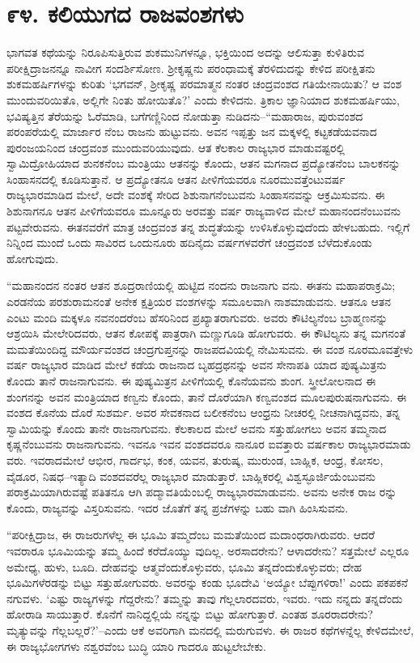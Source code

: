 
\chapter{೯೪. ಕಲಿಯುಗದ ರಾಜವಂಶಗಳು}

ಭಾಗವತ ಕಥೆಯನ್ನು ನಿರೂಪಿಸುತ್ತಿರುವ ಶುಕಮುನಿಗಳನ್ನೂ, ಭಕ್ತಿಯಿಂದ ಅದನ್ನು ಆಲಿಸುತ್ತಾ ಕುಳಿತಿರುವ ಪರೀಕ್ಷಿದ್ರಾಜನನ್ನೂ ನಾವೀಗ ಸಂದರ್ಶಿಸೋಣ. ಶ್ರೀಕೃಷ್ಣನು ಪರಂಧಾಮಕ್ಕೆ ತೆರಳಿದುದನ್ನು ಕೇಳಿದ ಪರೀಕ್ಷಿತನು ಶುಕಮಹರ್ಷಿಗಳನ್ನು ಕುರಿತು ‘ಭಗವನ್, ಶ್ರೀಕೃಷ್ಣ ಪರಮಾತ್ಮನ ನಂತರ ಚಂದ್ರವಂಶದ ಗತಿಯೇನಾಯಿತು? ಆ ವಂಶ ಮುಂದುವರಿಯಿತೊ, ಅಲ್ಲಿಗೇ ನಿಂತು ಹೋಯಿತೊ?’ ಎಂದು ಕೇಳಿದನು. ತ್ರಿಕಾಲ ಜ್ಞಾನಿಯಾದ ಶುಕಮಹರ್ಷಿಯು, ಭವಿಷ್ಯತ್ತಿನ ತೆರೆಯನ್ನು ಓರೆಮಾಡಿ, ಬಗೆಗಣ್ಣಿನಿಂದ ನೋಡುತ್ತಾ ನುಡಿದನು–“ಮಹಾರಾಜ, ಪುರುವಂಶದ ಪರಂಪರೆಯಲ್ಲಿ ಮಾರ್ಜಾರ ನೆಂಬ ರಾಜನು ಹುಟ್ಟುವನು. ಅವನ ಇಪ್ಪತ್ತು ಜನ ಮಕ್ಕಳಲ್ಲಿ ಕಟ್ಟಕಡೆಯವನಾದ ಪುರಂಜಯನಿಂದ ಚಂದ್ರವಂಶ ಮುಂದುವರಿಯುವುದು. ಆತ ಕೆಲಕಾಲ ರಾಜ್ಯಭಾರ ಮಾಡುವಷ್ಟರಲ್ಲಿ ಸ್ವಾಮಿದ್ರೋಹಿಯಾದ ಶುನಕನೆಂಬ ಮಂತ್ರಿಯು ಆತನನ್ನು ಕೊಂದು, ಆತನ ಮಗನಾದ ಪ್ರದ್ಯೋತನೆಂಬ ಬಾಲಕನನ್ನು ಸಿಂಹಾಸನದಲ್ಲಿ ಕೂಡಿಸುತ್ತಾನೆ. ಆ ಪ್ರದ್ಯೋತನೂ ಆತನ ಪೀಳಿಗೆಯವರೂ ನೂರಮುವತ್ತೆಂಟುವರ್ಷ ರಾಜ್ಯಭಾರಮಾಡಿದ ಮೇಲೆ, ಅದೇ ವಂಶಕ್ಕೆ ಸೇರಿದ ಶಿಶುನಾಗನೆಂಬುವನು ಸಿಂಹಾಸನವನ್ನು ಆಕ್ರಮಿಸುವನು. ಈ ಶಿಶುನಾಗನೂ ಆತನ ಪೀಳಿಗೆಯವರೂ ಮೂನ್ನೂರು ಅರವತ್ತು ವರ್ಷ ರಾಜ್ಯವಾಳಿದ ಮೇಲೆ ಮಹಾನಂದನೆಂಬುವನು ಪಟ್ಟವೇರುವನು. ಈತನವರೆಗೆ ಮಾತ್ರ ಚಂದ್ರವಂಶ ತನ್ನ ಶುದ್ಧತೆಯನ್ನು ಉಳಿಸಿಕೊಳ್ಳುವುದೆಂದು ಹೇಳಬಹುದು. ಇಲ್ಲಿಗೆ ನಿನ್ನಿಂದ ಮುಂದೆ ಒಂದು ಸಾವಿರದ ಒಂದುನೂರು ಹದಿನೈದು ವರ್ಷಗಳವರೆಗೆ ಚಂದ್ರವಂಶ ಬೆಳೆದುಕೊಂಡು ಹೋಗುವುದು.

“ಮಹಾನಂದನ ನಂತರ ಆತನ ಶೂದ್ರರಾಣಿಯಲ್ಲಿ ಹುಟ್ಟಿದ ನಂದನು ರಾಜನಾಗು ವನು. ಈತನು ಮಹಾಪರಾಕ್ರಮಿ; ಎರಡನೆಯ ಪರಶುರಾಮನಂತೆ ಅನೇಕ ಕ್ಷತ್ರಿಯರ ವಂಶಗಳನ್ನು ಸಮೂಲವಾಗಿ ನಾಶಮಾಡುವನು. ಆತನೂ ಆತನ ಎಂಟು ಮಂದಿ ಮಕ್ಕಳೂ ನವನಂದರೆಂಬ ಹೆಸರಿನಿಂದ ಪ್ರಖ್ಯಾತರಾಗುವರು. ಅವರು ಕೌಟಿಲ್ಯನೆಂಬ ಬ್ರಾಹ್ಮಣನನ್ನು ಆಶ್ರಯಿಸಿ ಮೇಲೇರಿದವರು, ಆತನ ಕೋಪಕ್ಕೆ ಪಾತ್ರರಾಗಿ ಮಣ್ಣುಗೂಡಿ ಹೋಗುವರು. ಈ ಕೌಟಿಲ್ಯನು ತನ್ನ ಮಗನಂತೆ ಮಮತೆಯಿಂದಿದ್ದ ಮೌರ್ಯವಂಶದ ಚಂದ್ರಗುಪ್ತನನ್ನು ರಾಜಪದವಿಯಲ್ಲಿ ನೇಮಿಸುವನು. ಈ ವಂಶ ನೂರಮೂವತ್ತೇಳು ವರ್ಷ ರಾಜ್ಯಭಾರ ಮಾಡಿದ ಮೇಲೆ ಕಡೆಯ ರಾಜನಾದ ಬೃಹದ್ರಥನನ್ನು ಅವನ ಸೇನಾಪತಿ ಯಾದ ಪುಷ್ಯಮಿತ್ರನು ಕೊಂದು ತಾನೆ ರಾಜನಾಗುವನು. ಈ ಪುಷ್ಯಮಿತ್ರನ ಪೀಳಿಗೆಯಲ್ಲಿ ಕೊನೆಯವನು ಶುಂಗ. ಸ್ತ್ರೀಲೋಲನಾದ ಈ ಶುಂಗನನ್ನು ಅವನ ಮಂತ್ರಿಯಾದ ಕಣ್ವನು ಕೊಂದು, ತಾನೆ ದೊರೆಯಾಗಿ ಕಣ್ವವಂಶದ ಮೂಲಪುರುಷನಾಗುವನು. ಈ ವಂಶದ ಕೊನೆಯ ದೊರೆ ಸುಶರ್ಮ. ಅವರ ಸೇವಕನಾದ ಬಲೀಕನೆಂಬ ಆಂಧ್ರನು ನೀಚರಲ್ಲಿ ನೀಚನಾಗಿದ್ದವನು, ತನ್ನ ಸ್ವಾಮಿಯನ್ನು ಕೊಂದು ತಾನೇ ರಾಜನಾಗುವನು. ಕೆಲಕಾಲದ ಮೇಲೆ ಅವನು ಸತ್ತುಹೋಗಲು ಅವನ ತಮ್ಮನಾದ ಕೃಷ್ಣನೆಂಬುವನು ರಾಜನಾಗುವನು. ಇವನೂ ಇವನ ವಂಶದವರೂ ನಾನೂರ ಐವತ್ತಾರು ವರ್ಷಕಾಲ ರಾಜ್ಯಭಾರಮಾಡು ವರು. ಇವರಾದಮೇಲೆ ಆಭೀರ, ಗಾರ್ದಭ, ಕಂಕ, ಯವನ, ತುರುಷ್ಕ, ಮುರುಂಡ, ಬಾಹ್ಲಿಕ, ಆಂಧ್ರ, ಕೋಸಲ, ವೈಡೂರ, ನಿಷಧ–ಇತ್ಯಾದಿ ವಂಶದವರೆಲ್ಲ ರಾಜ್ಯಭಾರ ಮಾಡುತ್ತಾರೆ. ಬಾಹ್ಲಿಕರಲ್ಲಿ ವಿಶ್ವಸ್ಫೂರ್ಜಿಯೆಂಬುವನು ಪರಾಕ್ರಮಿಯಾಗಿರುವಷ್ಟೆ ಪತಿತನೂ ಆಗಿ ಪದ್ಮಾವತಿಯೆಂಬಲ್ಲಿ ರಾಜ್ಯಭಾರಮಾಡುವನು. ಅವನು ಅನೇಕ ರಾಜ ರನ್ನು ಕೊಂದು, ರಾಜ್ಯವನ್ನು ವಿಸ್ತರಿಸುವನು. ಇದರ ಜೊತೆಗೆ ತನ್ನ ಪ್ರಜೆಗಳನ್ನು ಬಹು ವಾಗಿ ಹಿಂಸಿಸುವನು.

“ಪರೀಕ್ಷಿದ್ರಾಜ, ಈ ರಾಜರುಗಳೆಲ್ಲ ಈ ಭೂಮಿ ತಮ್ಮದೆಂಬ ಮಮತೆಯಿಂದ ಮದಾಂಧರಾಗಿರುವರು. ಆದರೆ ಇವರಾರೂ ಭೂಮಿಯನ್ನು ತಮ್ಮ ಹಿಂದೆ ಕರೆದೊಯ್ಯು ವುದಿಲ್ಲ. ಅರಸಾದರೇನು? ಆಳಾದರೇನು? ಸತ್ತಮೇಲೆ ಎಲ್ಲರೂ ಅಮೇಧ್ಯ, ಹುಳು, ಬೂದಿ. ದೇಹವನ್ನು ಆತ್ಮವೆಂದುಕೊಳ್ಳುವರು, ಭೂಮಿ ತನ್ನದೆಂದುಕೊಳ್ಳುವರು; ದೇಹ ಭೂಮಿಗಳೆರಡನ್ನು ಬಿಟ್ಟು ಸತ್ತುಹೋಗುವರು. ಅವರನ್ನು ಕಂಡು ಭೂದೇವಿ ‘ಅಯ್ಯೋ ಬೆಪ್ಪುಗಳಿರಾ!’ ಎಂದು ಪಕಪಕನೆ ನಗುವಳು. ‘ಎಷ್ಟು ರಾಜ್ಯಗಳನ್ನು ಗೆದ್ದರೇನು? ತಮ್ಮನ್ನು ತಾವು ಗೆಲ್ಲಲಾರದವರು, ಇವರು. ಇದು ನನ್ನದು ತನ್ನದೆಂದು ಹೋರಾಡಿ ಸಾಯುತ್ತಾರೆ. ಕೊನೆಗೆ ನಾನಿದ್ದಲ್ಲಿಯೆ ನನ್ನನ್ನು ಬಿಟ್ಟು ಹೋಗುತ್ತಾರೆ. ಎಂತಹ ಶೂರರಾದರೇನು? ಮೃತ್ಯುವನ್ನು ಗೆಲ್ಲಬಲ್ಲರೆ?’–ಎಂದು ಆಕೆ ಅವರಿಗಾಗಿ ಮನದಲ್ಲಿ ಮರುಗುವಳು. ಈ ರಾಜರ ಕಥೆಗಳನ್ನೆಲ್ಲ ಕೇಳಿದಮೇಲೆ, ಈ ರಾಜ್ಯಭೋಗಗಳು ನಶ್ವರವೆಂಬ ಬುದ್ಧಿ ಯಾರಿ ಗಾದರೂ ಹುಟ್ಟಲೇಬೇಕು.

